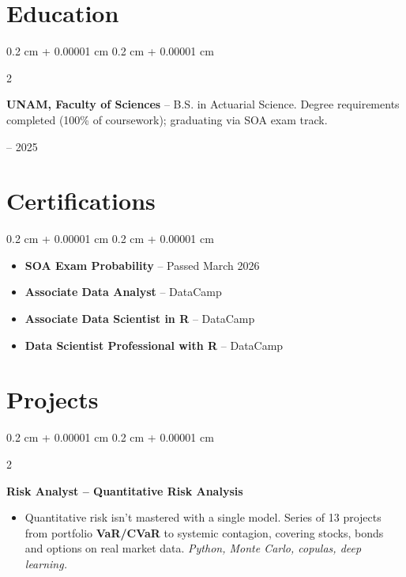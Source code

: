 \documentclass[10pt, letterpaper]{article}
\newenvironment{highlights}{
    \begin{itemize}[
        topsep=0.05 cm,
        parsep=0.05 cm,
        partopsep=0pt,
        itemsep=0pt,
        leftmargin=0.4 cm + 10pt
    ]
}{
    \end{itemize}
}
\newenvironment{highlightsforbulletentries}{
    \begin{itemize}[
        topsep=0.02 cm,
        parsep=0.05 cm,
        partopsep=0pt,
        itemsep=0pt,
        leftmargin=10pt
    ]
}{
    \end{itemize}
}
\newenvironment{onecolentry}{
    \begin{adjustwidth}{
        0.2 cm + 0.00001 cm
    }{
        0.2 cm + 0.00001 cm
    }
}{
    \end{adjustwidth}
}
\newenvironment{twocolentry}[2][]{
    \onecolentry
    \def\secondColumn{#2}
    \setcolumnwidth{\fill, 4.0 cm}
    \begin{paracol}{2}
}{
    \switchcolumn \raggedleft \secondColumn
    \end{paracol}
    \endonecolentry
}
\newenvironment{twocolentrynarrow}[2][]{
    \onecolentry
    \def\secondColumn{#2}
    \setcolumnwidth{\fill, 2.2 cm}
    \begin{paracol}{2}
}{
    \switchcolumn \raggedleft \secondColumn
    \end{paracol}
    \endonecolentry
}
\newcommand{\hl}[1]{\textcolor{primaryColor}{\textbf{#1}}}
\let\hrefWithoutArrow\href
\renewcommand{\href}[2]{\hrefWithoutArrow{#1}{\ifthenelse{\equal{#2}{}}{ }{#2 }\raisebox{.15ex}{\footnotesize \faExternalLink*}}}
\begin{document}
    \section{Education}

        \begin{twocolentry}{2021 -- 2025}
            \textbf{UNAM, Faculty of Sciences} -- B.S. in Actuarial Science. Degree requirements completed (100\% of coursework); graduating via SOA exam track.
        \end{twocolentry}

    \section{Certifications}

    \begin{onecolentry}
        \begin{highlightsforbulletentries}
            \item \textbf{SOA Exam Probability} -- Passed March 2026 \href{https://drive.google.com/file/d/1rt3emgBnPpQi7NiXkBQeA5WwJTV0JuAf/view?usp=sharing}{}
            \item \textbf{Associate Data Analyst} -- DataCamp \href{https://drive.google.com/drive/folders/1-QUuVH3zPBPsl6RhUvuUWxpZkP1i8TYb?usp=sharing}{}
            \item \textbf{Associate Data Scientist in R} -- DataCamp \href{https://drive.google.com/file/d/1xVLk15A1LBbyXH1fZnd4eBTaJ4d8FLLO/view?usp=drive_link}{}
            \item \textbf{Data Scientist Professional with R} -- DataCamp \href{https://drive.google.com/file/d/1Woe6xqxofloFZ9uM2f5VsdGxY-WQWCRI/view?usp=drive_link}{}
        \end{highlightsforbulletentries}
    \end{onecolentry}


    \section{Projects}

\begin{twocolentrynarrow}{\href{https://gonorandres.github.io/blog/risk-analyst}{blog}}
    \textbf{Risk Analyst -- Quantitative Risk Analysis}
    \begin{highlights}
        \item Quantitative risk isn't mastered with a single model. Series of 13 projects from portfolio \hl{VaR/CVaR} to systemic contagion, covering stocks, bonds and options on real market data. \textit{Python, Monte Carlo, copulas, deep learning.}
    \end{highlights}
\end{twocolentrynarrow}
\end{document}
